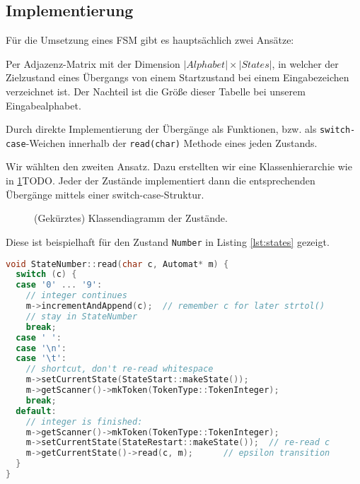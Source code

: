 \documentclass[
a4paper,   %
11pt,      %
oneside,   %
onecolumn, %
final      %
]{article}
\newcommand{\code}[1]{\lstinline$#1$}
\begin{document}
\subsection{Implementierung}
Für die Umsetzung eines FSM gibt es hauptsächlich zwei Ansätze:
\begin{description}
\item{Per Adjazenz-Matrix} mit der Dimension $|\mathit{Alphabet}| \times |\mathit{States}|$, in welcher der Zielzustand eines Übergangs von einem Startzustand bei einem Eingabezeichen verzeichnet ist. Der Nachteil ist die Größe dieser Tabelle bei unserem Eingabealphabet.
\item{Durch direkte Implementierung} der Übergänge als Funktionen, bzw. als \code{switch-case}-Weichen innerhalb der \code{read(char)} Methode eines jeden Zustands.
\end{description}
Wir wählten den zweiten Ansatz.
Dazu erstellten wir eine Klassenhierarchie wie in \ref{fig:states}TODO. Jeder der Zustände implementiert dann die entsprechenden Übergänge mittels einer switch-case-Struktur.
\begin{figure}[Htb] %
\begin{center}
\end{center}
\caption{(Gekürztes) Klassendiagramm der Zustände.} \label{fig:states}
\end{figure}
Diese ist beispielhaft für den Zustand \texttt{Number} in Listing \ref{lst:states} gezeigt.

\begin{lstlisting}[language=C++, firstnumber=116, caption={Ausscchnitt aus \texttt{states.cpp}. Die \code{read()}-Methode des Zustands \texttt{Number}.}, label=lst:state]
void StateNumber::read(char c, Automat* m) {
  switch (c) {
  case '0' ... '9':
    // integer continues
    m->incrementAndAppend(c);  // remember c for later strtol()
    // stay in StateNumber
    break;
  case ' ':
  case '\n':
  case '\t':
    // shortcut, don't re-read whitespace
    m->setCurrentState(StateStart::makeState());
    m->getScanner()->mkToken(TokenType::TokenInteger);
    break;
  default:
    // integer is finished:
    m->getScanner()->mkToken(TokenType::TokenInteger);
    m->setCurrentState(StateRestart::makeState());  // re-read c
    m->getCurrentState()->read(c, m);      // epsilon transition
  }
}
\end{lstlisting}
\end{document}
